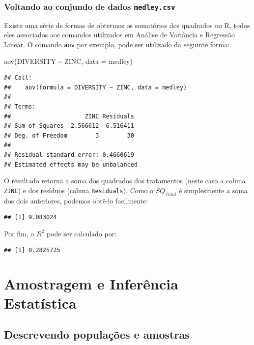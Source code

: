\documentclass[
]{book}
\newenvironment{Shaded}{\begin{snugshade}}{\end{snugshade}}
\newcommand{\AttributeTok}[1]{\textcolor[rgb]{0.77,0.63,0.00}{#1}}
\newcommand{\FunctionTok}[1]{\textcolor[rgb]{0.00,0.00,0.00}{#1}}
\newcommand{\NormalTok}[1]{#1}
\newcommand{\SpecialCharTok}[1]{\textcolor[rgb]{0.00,0.00,0.00}{#1}}
\begin{document}
\hypertarget{voltando-ao-conjundo-de-dados-medley.csv}{%
\section{\texorpdfstring{Voltando ao conjundo de dados \texttt{medley.csv}}{Voltando ao conjundo de dados medley.csv}}\label{voltando-ao-conjundo-de-dados-medley.csv}}

Existe uma série de formas de obtermos os somatórios dos quadrados no R, todos eles associados aos comandos utilizados em Análise de Variância e Regressão Linear. O comando \texttt{aov} por exemplo, pode ser utilizado da seguinte forma:

\begin{Shaded}
\begin{Highlighting}[]
\FunctionTok{aov}\NormalTok{(DIVERSITY }\SpecialCharTok{\textasciitilde{}}\NormalTok{ ZINC, }\AttributeTok{data =}\NormalTok{ medley)}
\end{Highlighting}
\end{Shaded}

\begin{verbatim}
## Call:
##    aov(formula = DIVERSITY ~ ZINC, data = medley)
## 
## Terms:
##                     ZINC Residuals
## Sum of Squares  2.566612  6.516411
## Deg. of Freedom        3        30
## 
## Residual standard error: 0.4660619
## Estimated effects may be unbalanced
\end{verbatim}

O resultado retorna a soma dos quadrados dos tratamentos (neste caso a coluna \texttt{ZINC}) e dos resíduos (coluna \texttt{Residuals}). Como o \(SQ_{Total}\) é simplesmente a soma dos dois anteriores, podemos obtê-lo facilmente:

\begin{verbatim}
## [1] 9.083024
\end{verbatim}

Por fim, o \(R^2\) pode ser calculado por:

\begin{verbatim}
## [1] 0.2825725
\end{verbatim}

\hypertarget{part-amostragem-e-inferuxeancia-estatuxedstica}{%
\part{Amostragem e Inferência Estatística}\label{part-amostragem-e-inferuxeancia-estatuxedstica}}

\hypertarget{popamostra}{%
\chapter{Descrevendo populações e amostras}\label{popamostra}}
\end{document}
